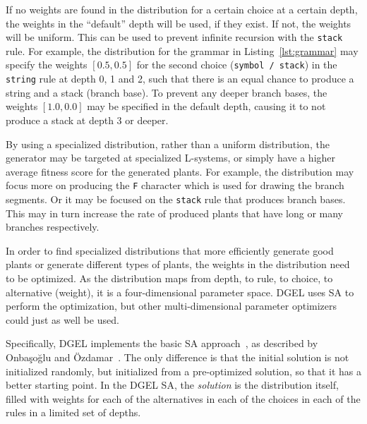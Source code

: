 If no weights are found in the distribution for a certain choice at a certain depth, the weights in the ``default'' depth will be used, if they exist.
If not, the weights will be uniform.
This can be used to prevent infinite recursion with the \texttt{stack} rule.
For example, the distribution for the grammar in Listing~\ref{lst:grammar} may specify the weights $[0.5, 0.5]$ for the second choice (\texttt{symbol / stack}) in the \texttt{string} rule at depth 0, 1 and 2, such that there is an equal chance to produce a string and a stack (\gls{branch base}).
To prevent any deeper \glspl{branch base}, the weights $[1.0, 0.0]$ may be specified in the default depth, causing it to not produce a stack at depth 3 or deeper.

By using a specialized distribution, rather than a uniform distribution, the generator may be targeted at specialized \glspl{L-system}, or simply have a higher average fitness score for the generated plants.
For example, the distribution may focus more on producing the \texttt{F} character which is used for drawing the \glspl{branch segment}.
Or it may be focused on the \texttt{stack} rule that produces \glspl{branch base}.
This may in turn increase the rate of produced plants that have long or many branches respectively.

In order to find specialized distributions that more efficiently generate good plants or generate different types of plants, the weights in the distribution need to be optimized.
As the distribution maps from depth, to rule, to choice, to alternative (weight), it is a four-dimensional parameter space.
\gls{DGEL} uses \gls{SA} to perform the optimization, but other multi-dimensional parameter optimizers could just as well be used.

Specifically, \gls{DGEL} implements the basic \gls{SA} approach~\cite{2000Ozdamar}, as described by Onbaşoğlu and Özdamar~\cite{2001Onbasoglu}.
The only difference is that the initial solution is not initialized randomly, but initialized from a pre-optimized solution, so that it has a better starting point.
In the \gls{DGEL} \gls{SA}, the \textit{solution} is the distribution itself, filled with weights for each of the alternatives in each of the choices in each of the rules in a limited set of depths.

